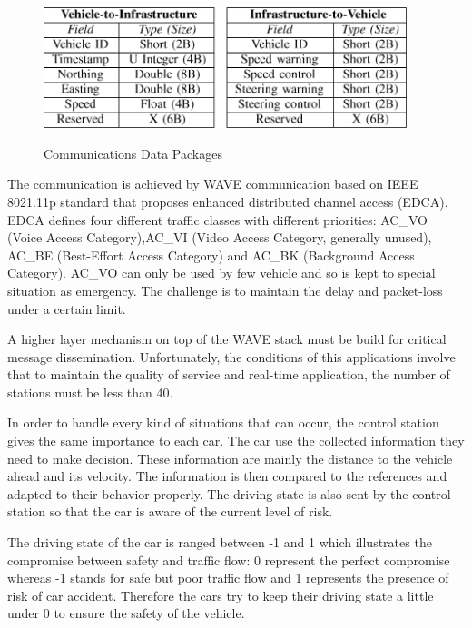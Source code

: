 \begin{center}
    \begin{figure}[ht!]
        \centering
        
        \includegraphics[width=400px, keepaspectratio]{imports/data_package_v2i_communication.png}
        
        \caption{Communications Data Packages}  
        \cite{v2i_management}
    \end{figure}
\end{center}

The communication is achieved by WAVE \cite{v2i_management} communication based on IEEE 8021.11p standard that proposes enhanced distributed channel access (EDCA). EDCA defines four different traffic classes with different priorities:  AC\_VO (Voice Access Category),AC\_VI (Video Access Category, generally unused),  AC\_BE (Best-Effort Access Category) and  AC\_BK (Background Access Category). AC\_VO can only be used by few vehicle and so is kept to special situation as emergency. The challenge is to maintain the delay and packet-loss under a certain limit.
\smallskip

A higher layer mechanism on top of the WAVE stack must be build for critical message dissemination. Unfortunately, the conditions of this applications involve that to maintain the quality of service and real-time application, the number of stations must be less than 40.

\smallskip

In order to handle every kind of situations that can occur, the control station gives the same importance to each car. The car use the collected information they need to make decision. These information are mainly the distance to the vehicle ahead and its velocity. The information is then compared to the references and adapted to their behavior properly. The driving state is also sent by the control station so that the car is aware of the current level of risk.

\smallskip

The driving state \cite{v2i_management} of the car is ranged between -1 and 1 which illustrates the compromise between safety and traffic flow: 0 represent the perfect compromise whereas -1 stands for safe but poor traffic flow and 1 represents the presence of risk of car accident. Therefore the cars try to keep their driving state a little under 0 to ensure the safety of the vehicle.


